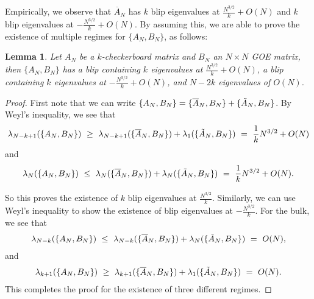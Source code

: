 \documentclass[11pt,reqno]{amsart}
\numberwithin{equation}{section}
\theoremstyle{plain}
\newtheorem{lemma}[thm]{Lemma}
\begin{document}
Empirically, we observe that $\overline{A}_N$ has $k$ blip eigenvalues at $\frac{N^{3/2}}{k}+O(N)$ and $k$ blip eigenvalues at $-\frac{N^{3/2}}{k}+O(N)$. By assuming this, we are able to prove the existence of multiple regimes for $\{A_N, B_N\}$, as follows:

\begin{lemma}
Let $A_N$ be a $k$-checkerboard matrix and $B_N$ an $N\times N$ GOE matrix, then $\{A_N,B_N\}$ has a blip containing $k$ eigenvalues at $\frac{N^{3/2}}{k} + O(N)$, a blip containing $k$ eigenvalues at $-\frac{N^{3/2}}{k}+ O(N)$, and $N-2k$ eigenvalues of $O(N)$.
\end{lemma}

\begin{proof}
First note that we can write $\{A_N,B_N\}=\{\overline{A}_N,B_N\} + \{\Tilde{A}_N,B_N\}$. By Weyl's inequality, we see that 
\begin{align}
\lambda_{N-k+1}(\{A_N,B_N\})\ \geq \ \lambda_{N-k+1}(\{\overline{A}_N,B_N\}) + \lambda_1(\{\Tilde{A}_N,B_N\})\ = \ \frac{1}{k}N^{3/2}+O(N)
\end{align}
and 
\begin{align}
\lambda_N(\{A_N,B_N\})\ \leq \ \lambda_N(\{\overline{A}_N,B_N\}) + \lambda_N(\{\Tilde{A}_N,B_N\})\ = \ \frac{1}{k}N^{3/2}+O(N).
\end{align}

So this proves the existence of $k$ blip eigenvalues at $\frac{N^{3/2}}{k}$. Similarly, we can use Weyl's inequality to show the existence of blip eigenvalues at $-\frac{N^{3/2}}{k}$. For the bulk, we see that 
\begin{align}
\lambda_{N-k}(\{A_N,B_N\})\ \leq \ \lambda_{N-k}(\{\overline{A}_N,B_N\}) + \lambda_N(\{\Tilde{A}_N,B_N\})\ = \ O(N),
\end{align}
and 
\begin{align}
\lambda_{k+1}(\{A_N,B_N\})\ \geq \ \lambda_{k+1}(\{\overline{A}_N,B_N\}) + \lambda_1(\{\Tilde{A}_N,B_N\})\ = \ O(N).
\end{align}
This completes the proof for the existence of three different regimes. 
\end{proof}
\end{document}
